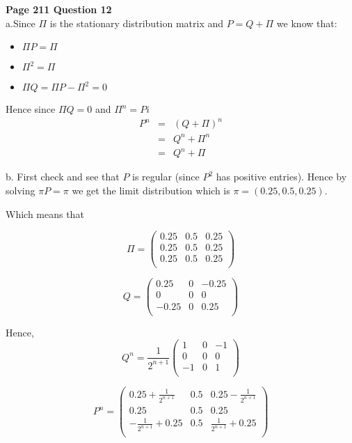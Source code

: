\documentclass[10pt,a4paper]{article}
\begin{document}
\begin{flushleft}
\begin{eqnarray*}
\\
\end{eqnarray*}

\textbf{Page 211 Question 12}\\

a.Since $\Pi$ is the stationary distribution matrix and $P =
Q+\Pi$ we know that:
\begin{itemize}
    \item $\Pi P = \Pi $
    \item $ \Pi^2= \Pi $
    \item $\Pi Q = \Pi P -\Pi^2 = 0$
\end{itemize}

Hence since $\Pi Q = 0$ and $\Pi^n=Pi$
\begin{eqnarray*}
P^n &=& (Q+\Pi)^n\\
 &=& Q^n+\Pi^n\\
 &=& Q^n+\Pi
\end{eqnarray*}

b. First check and see that $P$ is regular (since $P^2$ has
positive entries). Hence by solving $\pi P = \pi$ we get the limit
distribution which is $\pi = (0.25,0.5,0.25)$.

Which means that

\[ \Pi = \left ( \begin{array}{ccc}
 0.25 & 0.5 & 0.25 \\
 0.25 & 0.5 & 0.25 \\
 0.25 & 0.5 & 0.25 \\
\end{array} \right) \]


\[ Q = \left ( \begin{array}{ccc}
 0.25 & 0 & -0.25 \\
 0 & 0 & 0 \\
 -0.25 & 0 & 0.25 \\
\end{array} \right) \]

Hence,
\[ Q^n = \frac{1}{2^{n+1}}\left ( \begin{array}{ccc}
 1 & 0 & -1 \\
 0 & 0 & 0 \\
 -1 & 0 & 1 \\
\end{array} \right) \]

\[ P^n = \left ( \begin{array}{ccc}
 0.25+\frac{1}{2^{n+1}} & 0.5 & 0.25-\frac{1}{2^{n+1}} \\
 0.25 & 0.5 & 0.25 \\
 -\frac{1}{2^{n+1}}+0.25 & 0.5 & \frac{1}{2^{n+1}}+0.25 \\
\end{array} \right) \]


\begin{eqnarray*}
\\
\end{eqnarray*}

\end{flushleft}
\end{document}
